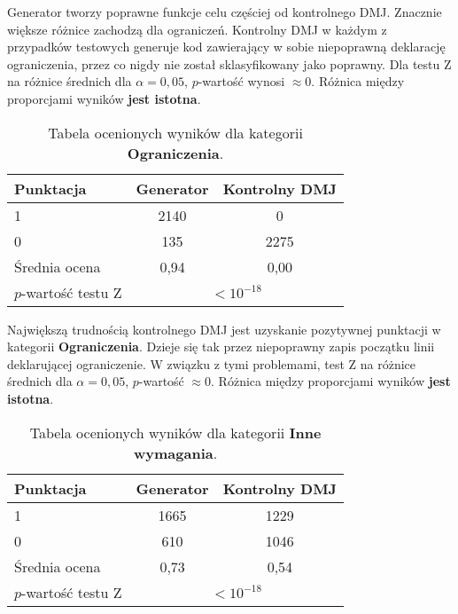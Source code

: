 
Generator tworzy poprawne funkcje celu częściej od kontrolnego DMJ. 
Znacznie większe różnice zachodzą dla ograniczeń. Kontrolny DMJ w każdym z przypadków testowych generuje kod zawierający w sobie niepoprawną deklarację ograniczenia, przez co nigdy nie został sklasyfikowany jako poprawny. Dla testu Z na różnice średnich dla $\alpha = 0,05$, %
$p$-wartość wynosi $\approx0$. Różnica między proporcjami wyników \textbf{jest istotna}.

\begin{table}[H]
\caption{Tabela ocenionych wyników dla kategorii \textbf{Ograniczenia}.}\label{tab:tabela14}
\centering%
\begin{tabular}{|l|c|c|}
\hline
\textbf{Punktacja} & \textbf{Generator} & \textbf{Kontrolny DMJ}\\
\hline
1 & 2140 & 0 \\
\hline
0 & 135 & 2275 \\
\hline
Średnia ocena & 0,94 & 0,00 \\
\hline
$p$-wartość testu Z&\multicolumn{2}{c|}{$<10^{-18}$}\\
\hline
\end{tabular}
\end{table}


Największą trudnością kontrolnego DMJ jest uzyskanie pozytywnej punktacji w kategorii \textbf{Ograniczenia}. Dzieje się tak przez niepoprawny zapis początku linii deklarującej ograniczenie. W związku z tymi problemami, test Z na różnice średnich dla $\alpha = 0,05$, %
$p$-wartość $\approx0$. Różnica między proporcjami wyników \textbf{jest istotna}.

\begin{table}[H]
\caption{Tabela ocenionych wyników dla kategorii \textbf{Inne wymagania}.}\label{tab:tabela15}
\centering%
\begin{tabular}{|l|c|c|}
\hline
\textbf{Punktacja} & \textbf{Generator} & \textbf{Kontrolny DMJ}\\
\hline
1 & 1665 & 1229 \\
\hline
0 & 610 & 1046 \\
\hline
Średnia ocena & 0,73 & 0,54 \\
\hline
$p$-wartość testu Z&\multicolumn{2}{c|}{$<10^{-18}$}\\
\hline
\end{tabular}
\end{table}


